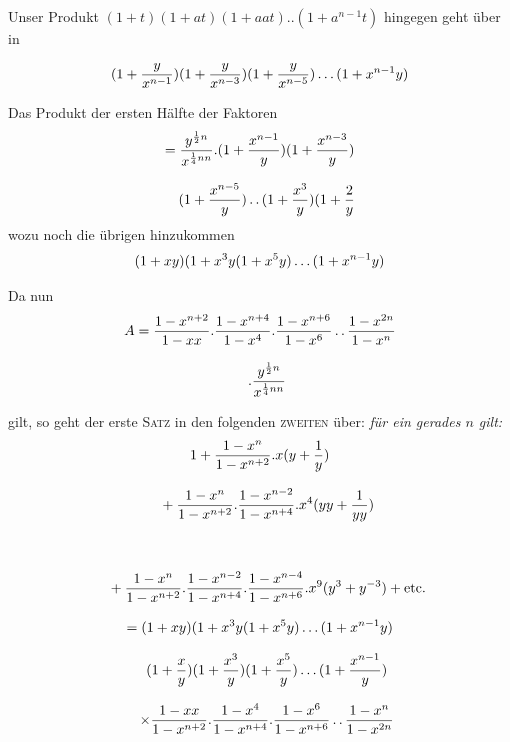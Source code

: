 Unser Produkt $(1+t)(1+at)(1+aat)..(1+a^{n-1}t)$ hingegen geht über in




\[
(1+\frac{y}{x^{n-1}})(1+\frac{y}{x^{n-3}})(1+\frac{y}{x^{n-5}})\mathinner{.\,.\,.}(1+x^{n-1}y)
\]

Das Produkt der ersten Hälfte der Faktoren
\[
\begin{gathered}=\frac{y^{\frac12n}}{x^{\frac14nn}}.(1+\frac{x^{n-1}}y)(1+\frac{x^{n-3}}y)\\[8pt]\quad{}(1+\frac{x^{n-5}}y)\mathinner{.\,.}(1+\frac{x^3}y)(1+\frac{2}{y}\end{gathered}
\]
wozu noch die übrigen hinzukommen
\[
(1+xy)(1+x^3y(1+x^5y)\mathinner{.\,.\,.}(1+x^{n-1}y)
\]

Da nun
\[
\begin{gathered}A=\frac{1-x^{n+2}}{1-xx}.\frac{1-x^{n+4}}{1-x^4}.\frac{1-x^{n+6}}{1-x^6}\mathinner{.\,.}\frac{1-x^{2n}}{1-x^n}\\[8pt]\quad{}.\frac{y^{\frac12n}}{x^{\frac14nn}}\end{gathered}
\]

gilt, so geht der erste \textsc{Satz} in den folgenden \textsc{zweiten} über: \textit{für ein gerades $n$ gilt:}
\[
\begin{gathered}
1+\frac{1-x^n}{1-x^{n+2}}.x(y+\frac1y)
\\[8pt]\quad{}+\frac{1-x^n}{1-x^{n+2}}.\frac{1-x^{n-2}}{1-x^{n+4}}.x^4(yy+\frac1{yy})\\[8pt]
\quad\\[8pt]\quad{}+\frac{1-x^n}{1-x^{n+2}}.\frac{1-x^{n-2}}{1-x^{n+4}}.\frac{1-x^{n-4}}{1-x^{n+6}}.x^9(y^3+y^{-3})+\text{etc.}\\[8pt]
=(1+xy)(1+x^3y(1+x^5y)\mathinner{.\,.\,.}(1+x^{n-1}y)
\\[8pt]\quad{}(1+\frac xy)(1+\frac{x^3}y)(1+\frac{x^5}y)\mathinner{.\,.\,.}(1+\frac{x^{n-1}}y)\\[8pt]
\quad\times\frac{1-xx}{1-x^{n+2}}.\frac{1-x^4}{1-x^{n+4}}.\frac{1-x^6}{1-x^{n+6}}\mathinner{.\,.}\frac{1-x^n}{1-x^{2n}}
\end{gathered}
\]

